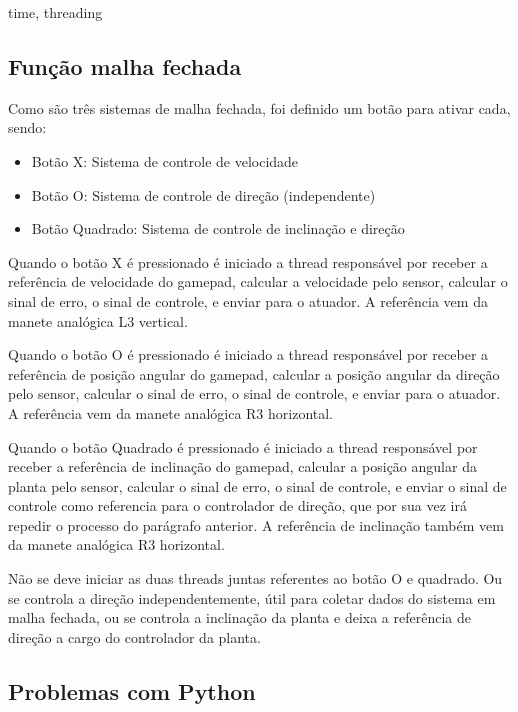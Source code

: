             time, threading
        
        \subsection{Função malha fechada}
        
            Como são três sistemas de malha fechada, foi definido um botão para ativar cada, sendo:
            \begin{itemize}
                \item Botão X: Sistema de controle de velocidade
                \item Botão O: Sistema de controle de direção (independente)
                \item Botão Quadrado: Sistema de controle de inclinação e direção
            \end{itemize}
            
            Quando o botão X é pressionado é iniciado a thread responsável por receber a referência de velocidade do gamepad, calcular a velocidade pelo sensor, calcular o sinal de erro, o sinal de controle, e enviar para o atuador. A referência vem da manete analógica L3 vertical.
            
            Quando o botão O é pressionado é iniciado a thread responsável por receber a referência de posição angular do gamepad, calcular a posição angular da direção pelo sensor, calcular o sinal de erro, o sinal de controle, e enviar para o atuador. A referência vem da manete analógica R3 horizontal.
            
            Quando o botão Quadrado é pressionado é iniciado a thread responsável por receber a referência de inclinação do gamepad, calcular a posição angular da planta pelo sensor, calcular o sinal de erro, o sinal de controle, e enviar o sinal de controle como referencia para o controlador de direção, que por sua vez irá repedir o processo do parágrafo anterior. A referência de inclinação também vem da manete analógica R3 horizontal.
            
            Não se deve iniciar as duas threads juntas referentes ao botão O e quadrado. Ou se controla a direção independentemente, útil para coletar dados do sistema em malha fechada, ou se controla a inclinação da planta e deixa a referência de direção a cargo do controlador da planta.
            
        \subsection{Problemas com Python}
        
